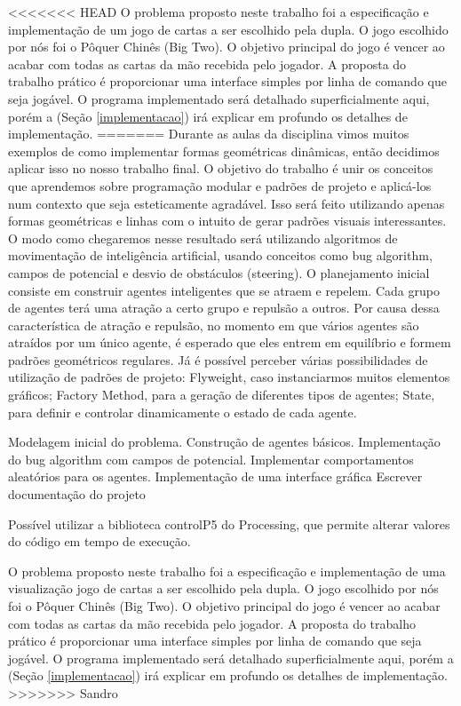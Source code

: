 \documentclass[12pt]{article}
\begin{document}
<<<<<<< HEAD
O problema proposto neste trabalho foi a especificação e implementação de um jogo de cartas a ser escolhido pela dupla. O jogo escolhido por nós foi o Pôquer Chinês (Big Two). O objetivo principal do jogo é vencer ao acabar com todas as cartas da mão recebida pelo jogador. A proposta do trabalho prático é proporcionar uma interface simples por linha de comando que seja jogável. O programa implementado será detalhado superficialmente aqui, porém a (Seção \ref{implementacao}) irá explicar em profundo os detalhes de implementação.
=======
Durante as aulas da disciplina vimos muitos exemplos de como implementar formas geométricas dinâmicas, então decidimos aplicar isso no nosso trabalho final. O objetivo do trabalho é unir os conceitos que aprendemos sobre programação modular e padrões de projeto e aplicá-los num contexto que seja esteticamente agradável. Isso será feito utilizando apenas formas geométricas e linhas com o intuito de gerar padrões visuais interessantes.
O modo como chegaremos nesse resultado será utilizando algoritmos de movimentação de inteligência artificial, usando conceitos como bug algorithm, campos de potencial e desvio de obstáculos (steering).
O planejamento inicial consiste em construir agentes inteligentes que se atraem e repelem. Cada grupo de agentes terá uma atração a certo grupo e repulsão a outros. Por causa dessa característica de atração e repulsão, no momento em que vários agentes são atraídos por um único agente, é esperado que eles entrem em equilíbrio e formem padrões geométricos regulares.
Já é possível perceber várias possibilidades de utilização de padrões de projeto:  Flyweight, caso instanciarmos muitos elementos gráficos; Factory Method, para a geração de diferentes tipos de agentes; State, para definir e controlar dinamicamente o estado de cada agente.

Modelagem inicial do problema.
Construção de agentes básicos.
Implementação do bug algorithm com campos de potencial.
Implementar comportamentos aleatórios para os agentes.
Implementação de uma interface gráfica
Escrever documentação do projeto

Possível utilizar a biblioteca controlP5 do Processing, que permite alterar valores do código em tempo de execução.


O problema proposto neste trabalho foi a especificação e implementação de uma visualização jogo de cartas a ser escolhido pela dupla. O jogo escolhido por nós foi o Pôquer Chinês (Big Two). O objetivo principal do jogo é vencer ao acabar com todas as cartas da mão recebida pelo jogador. A proposta do trabalho prático é proporcionar uma interface simples por linha de comando que seja jogável. O programa implementado será detalhado superficialmente aqui, porém a (Seção \ref{implementacao}) irá explicar em profundo os detalhes de implementação.
>>>>>>> Sandro
\end{document}
